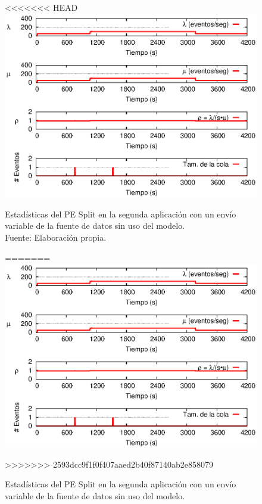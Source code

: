 \begin{figure}[!ht]
<<<<<<< HEAD
    \centering
    \captionsetup{justification=centering}
    \includegraphics[scale=1]{images/exp/app2/normal/sm/statusSplitPE.eps}
    \caption[Estadísticas del PE Split en la segunda aplicación con un envío variable de la fuente de datos sin uso del modelo.]{Estadísticas del PE Split en la segunda aplicación con un envío variable de la fuente de datos sin uso del modelo.\\Fuente: Elaboración propia.}
=======
\centering
    \includegraphics[scale=1.1]{images/exp/app2/normal/sm/statusSplitPE.eps}
    \caption{Estad\'isticas del PE Split en la segunda aplicaci\'on con un env\'io variable de la fuente de datos sin uso del modelo.}
>>>>>>> 2593dcc9f1f0f407aaed2b40f87140ab2e858079
    \label{fig:app2-normal-statusSplitPE-sm}
\end{figure}

